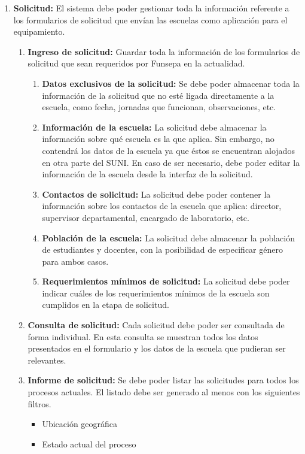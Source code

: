 \documentclass[11pt]{report}
\newcommand{\requisito}[2]{\textbf{#1:} #2}
\begin{document}
\begin{enumerate}[leftmargin=0.8cm]
		\item \requisito{Solicitud}{El sistema debe poder gestionar toda la información referente a los formularios de solicitud que envían las escuelas como aplicación para el equipamiento.}
		\begin{enumerate}
			\item \requisito{Ingreso de solicitud}{Guardar toda la información de los formularios de solicitud que sean requeridos por Funsepa en la actualidad.}
			\begin{enumerate}
				\item \requisito{Datos exclusivos de la solicitud}{Se debe poder almacenar toda la información de la solicitud que no esté ligada directamente a la escuela, como fecha, jornadas que funcionan, observaciones, etc.}
				\item \requisito{Información de la escuela}{La solicitud debe almacenar la información sobre qué escuela es la que aplica. Sin embargo, no contendrá los datos de la escuela ya que éstos se encuentran alojados en otra parte del SUNI. En caso de ser necesario, debe poder editar la información de la escuela desde la interfaz de la solicitud.}
				\item \requisito{Contactos de solicitud}{La solicitud debe poder contener la información sobre los contactos de la escuela que aplica: director, supervisor departamental, encargado de laboratorio, etc.}
				\item \requisito{Población de la escuela}{La solicitud debe almacenar la población de estudiantes y docentes, con la posibilidad de especificar género para ambos casos.}
				\item \requisito{Requerimientos mínimos de solicitud}{La solicitud debe poder indicar cuáles de los requerimientos mínimos de la escuela son cumplidos en la etapa de solicitud.}
			\end{enumerate}
			\item \requisito{Consulta de solicitud}{Cada solicitud debe poder ser consultada de forma individual. En esta consulta se muestran todos los datos presentados en el formulario y los datos de la escuela que pudieran ser relevantes.}
			\item \requisito{Informe de solicitud}{Se debe poder listar las solicitudes para todos los procesos actuales. El listado debe ser generado al menos con los siguientes filtros.
				\begin{itemize}
					\item Ubicación geográfica
					\item Estado actual del proceso

\end{itemize}}
\end{enumerate}
\end{enumerate}
\end{document}
